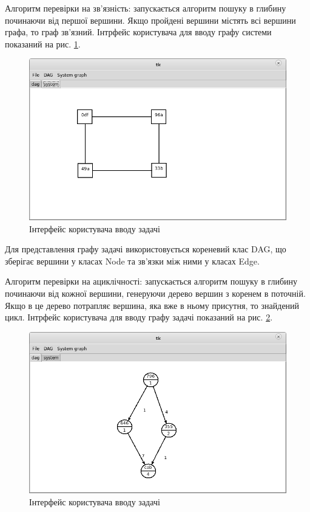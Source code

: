 Алгоритм перевірки на зв'язність: запускається алгоритм пошуку в глибину починаючи від першої вершини. Якщо пройдені вершини містять всі вершини графа, то граф зв'язний. Інтрфейс користувача для вводу графу системи показаний на рис. \ref{fig:system_graph}.
    \begin{figure}[h!]
      \begin{center}
        \includegraphics[width=\textwidth]{res/system_graph.png}
      \end{center}
      \caption{Інтерфейс користувача вводу задачі}
    \label{fig:system_graph}
    \end{figure}



    Для представлення графу задачі використовується кореневий клас DAG, що зберігає вершини у класах Node та зв'язки між ними у класах Edge.

    Алгоритм перевірки на ациклічності: запускається алгоритм пошуку в глибину починаючи від кожної вершини, генеруючи дерево вершин з коренем в поточній. Якщо в це дерево потрапляє вершина, яка вже в ньому присутня, то знайдений цикл. Інтрфейс користувача для вводу графу задачі показаний на рис. \ref{fig:gui_graph}.
    \begin{figure}[h!]
      \begin{center}
        \includegraphics[width=\textwidth]{res/gui_graph.png}
      \end{center}
      \caption{Інтерфейс користувача вводу задачі}
    \label{fig:gui_graph}
    \end{figure}


